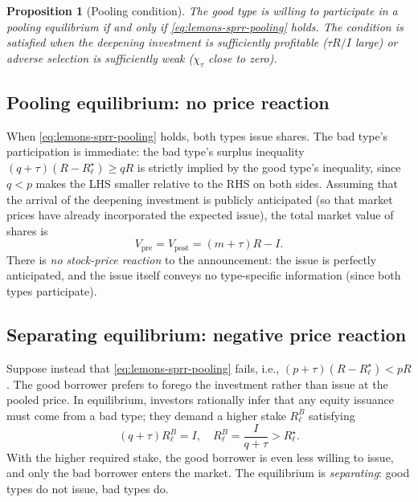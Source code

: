 \documentclass[11pt,a4paper,oneside]{book}
\def\geq{\geqslant}
\theoremstyle{plain}
\newtheorem{proposition}[theorem]{Proposition}
\theoremstyle{definition}
\theoremstyle{remark}
\numberwithin{equation}{chapter}
\begin{document}
\begin{proposition}[Pooling condition]\label{prop:lemons-pooling-condition}
The good type is willing to participate in a pooling equilibrium if and only if \eqref{eq:lemons-sprr-pooling} holds.
The condition is satisfied when the deepening investment is sufficiently profitable ($\tau R/I$ large) or adverse selection is sufficiently weak ($\chi_\tau$ close to zero).
\end{proposition}

\subsection{Pooling equilibrium: no price reaction}

When \eqref{eq:lemons-sprr-pooling} holds, both types issue shares.
The bad type's participation is immediate: the bad type's surplus inequality $(q + \tau)(R - R_\ell^\star) \geq qR$ is strictly implied by the good type's inequality, since $q < p$ makes the LHS smaller relative to the RHS on both sides.
Assuming that the arrival of the deepening investment is publicly anticipated (so that market prices have already incorporated the expected issue), the total market value of shares is
\begin{equation*}
  V_{\text{pre}} = V_{\text{post}} = (m + \tau) R - I.
\end{equation*}
There is \emph{no stock-price reaction} to the announcement: the issue is perfectly anticipated, and the issue itself conveys no type-specific information (since both types participate).

\subsection{Separating equilibrium: negative price reaction}

Suppose instead that \eqref{eq:lemons-sprr-pooling} fails, i.e., $(p + \tau)(R - R_\ell^\star) < pR$.
The good borrower prefers to forego the investment rather than issue at the pooled price.
In equilibrium, investors rationally infer that any equity issuance must come from a bad type; they demand a higher stake $R_\ell^{B}$ satisfying
\begin{equation*}
  (q + \tau) R_\ell^{B} = I,
  \quad
  R_\ell^{B} = \frac{I}{q + \tau} > R_\ell^\star.
\end{equation*}
With the higher required stake, the good borrower is even less willing to issue, and only the bad borrower enters the market.
The equilibrium is \emph{separating}: good types do not issue, bad types do.
\end{document}
